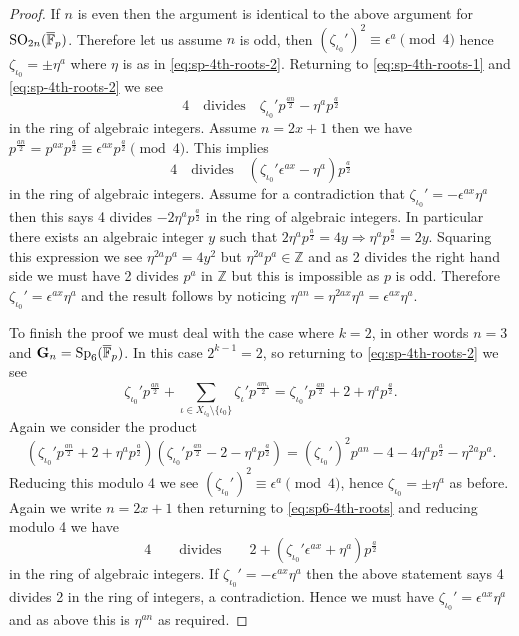 \documentclass{jt-calcs}
\begin{document}
\begin{proof}
If $n$ is even then the argument is identical to the above argument for $\operatorname{SO}_{2n}(\overline{\mathbb{F}}_p)$. Therefore let us assume $n$ is odd, then $(\zeta_{\iota_0}')^2 \equiv \epsilon^a \pmod{4}$ hence $\zeta_{\iota_0} = \pm\eta^a$ where $\eta$ is as in \eqref{eq:sp-4th-roots-2}. Returning to \eqref{eq:sp-4th-roots-1} and \eqref{eq:sp-4th-roots-2} we see
\begin{equation*}
4\quad\text{divides}\quad \zeta_{\iota_0}'p^{\frac{an}{2}} - \eta^ap^{\frac{a}{2}}
\end{equation*}
in the ring of algebraic integers. Assume $n = 2x + 1$ then we have $p^{\frac{an}{2}} = p^{ax}p^{\frac{a}{2}}\equiv \epsilon^{ax}p^{\frac{a}{2}} \pmod{4}$. This implies
\begin{equation*}
4\quad\text{divides}\quad (\zeta_{\iota_0}'\epsilon^{ax} - \eta^a)p^{\frac{a}{2}}
\end{equation*}
in the ring of algebraic integers. Assume for a contradiction that $\zeta_{\iota_0}' = -\epsilon^{ax}\eta^a$ then this says 4 divides $-2\eta^ap^{\frac{a}{2}}$ in the ring of algebraic integers. In particular there exists an algebraic integer $y$ such that $2\eta^ap^{\frac{a}{2}} = 4y \Rightarrow \eta^ap^{\frac{a}{2}}=2y$. Squaring this expression we see $\eta^{2a}p^a = 4y^2$ but $\eta^{2a}p^a \in \mathbb{Z}$ and as 2 divides the right hand side we must have 2 divides $p^a$ in $\mathbb{Z}$ but this is impossible as $p$ is odd. Therefore $\zeta_{\iota_0}' = \epsilon^{ax}\eta^a$ and the result follows by noticing $\eta^{an} = \eta^{2ax}\eta^a = \epsilon^{ax}\eta^a$.

To finish the proof we must deal with the case where $k=2$, in other words $n=3$ and $\mathbf{G}_n = \operatorname{Sp}_6(\overline{\mathbb{F}}_p)$. In this case $2^{k-1} = 2$, so returning to \eqref{eq:sp-4th-roots-2} we see
\begin{equation}\label{eq:sp6-4th-roots}
\zeta_{\iota_0}'p^{\frac{an}{2}} + \sum_{\iota \in X_{\iota_0}\setminus \{\iota_0\}} \zeta_{\iota}' p^{\frac{am_{\iota}}{2}} = \zeta_{\iota_0}'p^{\frac{an}{2}} + 2 + \eta^a p^{\frac{a}{2}}.
\end{equation}
Again we consider the product
\begin{equation*}
(\zeta_{\iota_0}'p^{\frac{an}{2}} + 2 + \eta^a p^{\frac{a}{2}})(\zeta_{\iota_0}'p^{\frac{an}{2}} - 2 - \eta^a p^{\frac{a}{2}}) = (\zeta_{\iota_0}')^2p^{an} - 4 - 4\eta^ap^{\frac{a}{2}} - \eta^{2a}p^a.
\end{equation*}
Reducing this modulo 4 we see $(\zeta_{\iota_0}')^2 \equiv \epsilon^a \pmod{4}$, hence $\zeta_{\iota_0} = \pm\eta^a$ as before. Again we write $n = 2x+1$ then returning to \eqref{eq:sp6-4th-roots} and reducing modulo 4 we have
\begin{equation*}
4\qquad\text{divides}\qquad 2 + (\zeta_{\iota_0}'\epsilon^{ax} + \eta^a) p^{\frac{a}{2}}
\end{equation*}
in the ring of algebraic integers. If $\zeta_{\iota_0}' = -\epsilon^{ax}\eta^a$ then the above statement says 4 divides 2 in the ring of integers, a contradiction. Hence we must have $\zeta_{\iota_0}' = \epsilon^{ax}\eta^a$ and as above this is $\eta^{an}$ as required.
\end{proof}
\end{document}
